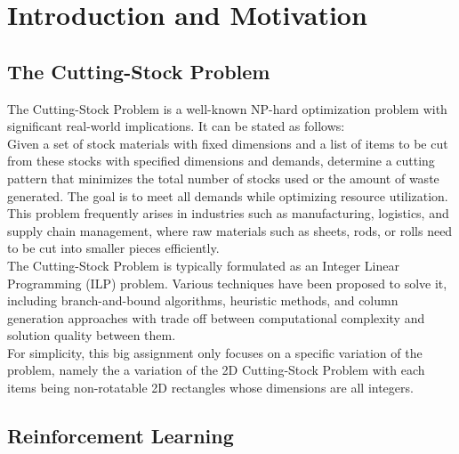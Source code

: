 \documentclass[a4paper]{article}
\begin{document}
    
    \pagebreak
    
    
    \section{Introduction and Motivation}

    \subsection{The Cutting-Stock Problem}

    The Cutting-Stock Problem is a well-known NP-hard optimization problem with significant real-world implications. It can be stated as follows:
    \vspace{0.2cm}\\
    Given a set of stock materials with fixed dimensions and a list of items to be cut from these stocks with specified dimensions and demands, 
    determine a cutting pattern that minimizes the total number of stocks used or the amount of waste generated. The goal is to meet all demands while optimizing resource utilization.
    \vspace{0.2cm}\\
    This problem frequently arises in industries such as manufacturing, logistics, and supply chain management, where raw materials such as sheets, rods, or rolls need to be cut into smaller pieces efficiently. 
    \vspace{0.2cm}\\
    The Cutting-Stock Problem is typically formulated as an Integer Linear Programming (ILP) problem. Various techniques have been proposed to solve it, including branch-and-bound algorithms, heuristic methods, and column generation approaches with trade off between computational complexity and solution quality between them.
    \vspace{0.2cm}\\
    For simplicity, this big assignment only focuses on a specific variation of the problem, namely the a variation of the 2D Cutting-Stock Problem with each items being non-rotatable 2D rectangles whose dimensions are all integers.

    \subsection{Reinforcement Learning}
\end{document}
